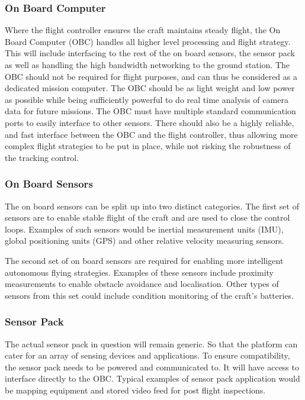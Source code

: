 			\subsubsection{On Board Computer}
			Where the flight controller ensures the craft maintains steady flight, the On Board Computer (OBC) handles all higher level processing and flight strategy. This will include interfacing to the rest of the on board sensors, the sensor pack as well as handling the high bandwidth networking to the ground station. The OBC should not be required for flight purposes, and can thus be considered as a dedicated mission computer. 
			The OBC should be as light weight and low power as possible while being sufficiently powerful to do real time analysis of camera data for future missions. The OBC must have multiple standard communication ports to easily interface to other sensors. There should also be a highly reliable, and fast interface between the OBC and the flight controller, thus allowing more complex flight strategies to be put in place, while not risking the robustness of the tracking control.
		
			\subsubsection{On Board Sensors}
			The on board sensors can be split up into two distinct categories. The first set of sensors are to enable stable flight of the craft and are used to close the control loops. Examples of such sensors would be inertial measurement units (IMU), global positioning units (GPS) and other relative velocity measuring sensors. 
			
			The second set of on board sensors are required for enabling more intelligent autonomous flying strategies. Examples of these sensors include proximity measurements to enable obstacle avoidance and localisation. Other types of sensors from this set could include condition monitoring of the craft's batteries. 
		
			\subsubsection{Sensor Pack}
			The actual sensor pack in question will remain generic. So that the platform can cater for an array of sensing devices and applications. To ensure compatibility, the sensor pack needs to be powered and communicated to. It will have access to interface directly to the OBC. Typical examples of sensor pack application would be mapping equipment and stored video feed for post flight inspections.
		
